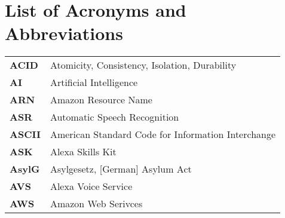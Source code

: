 \section*{List of Acronyms and Abbreviations }
\begin{flushleft}
\begin{tabular}{ll}



\textbf{ACID}	&	Atomicity, Consistency, Isolation, Durability\\ %
\textbf{AI}		&	Artificial Intelligence\\
\textbf{ARN}	&	Amazon Resource Name\\
\textbf{ASR}	&	Automatic Speech Recognition\\
\textbf{ASCII}&	American Standard Code for Information Interchange\\%
\textbf{ASK}	&	Alexa Skills Kit\\
\textbf{AsylG}	&	Asylgesetz, [German] Asylum Act\\
\textbf{AVS}	&	Alexa Voice Service\\
\textbf{AWS}	&	Amazon Web Serivces\\


\end{tabular}
\end{flushleft}
